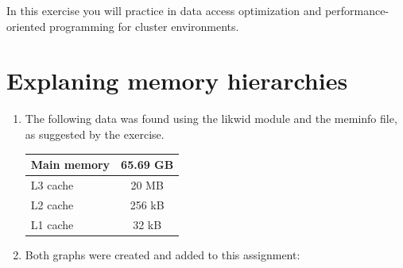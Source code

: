 \documentclass[unicode,11pt,a4paper,oneside,numbers=endperiod,openany]{scrartcl}
\begin{document}
\setassignment
{}

\newline

In this exercise you will practice in data access optimization and performance-oriented programming for cluster environments.


\section{Explaning memory hierarchies }

    \begin{enumerate}
        \item  The following data was found using the likwid module and the meminfo file, as suggested by the exercise.\\
            \begin{tabular}{| l || c |}
                \hline
                Main memory & 65.69 GB \\ 
                \hline
                L3 cache & 20 MB \\
                \hline
                L2 cache & 256 kB \\
                \hline 
                L1 cache & 32 kB \\
                \hline
            \end{tabular}
        \item  Both graphs were created and added to this assignment: 


\end{enumerate}
\end{document}

